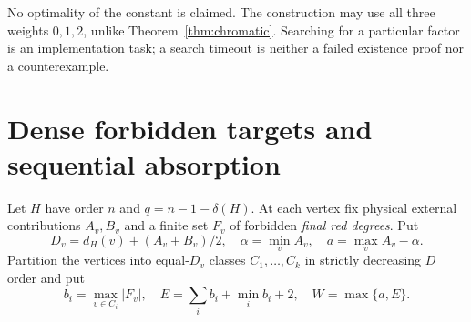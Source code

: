 No optimality of the constant is claimed. The construction may use
all three weights $0,1,2$, unlike Theorem~\ref{thm:chromatic}.
Searching for a particular factor is an implementation task; a search
timeout is neither a failed existence proof nor a counterexample.

\section{Dense forbidden targets and sequential absorption}\label{sec:denselists}

Let $H$ have order $n$ and $q=n-1-\delta(H)$. At each vertex fix
physical external contributions $A_v,B_v$ and a finite set $F_v$ of
forbidden \emph{final red degrees}. Put
\[
 D_v=d_H(v)+(A_v+B_v)/2,\quad
 \alpha=\min_v A_v,\quad a=\max_v A_v-\alpha.
\]
Partition the vertices into equal-$D_v$ classes $C_1,\ldots,C_k$ in
strictly decreasing $D$ order and put
\[
 b_i=\max_{v\in C_i}|F_v|,\quad
 E=\sum_i b_i+\min_i b_i+2,\quad W=\max\{a,E\}.
\]

